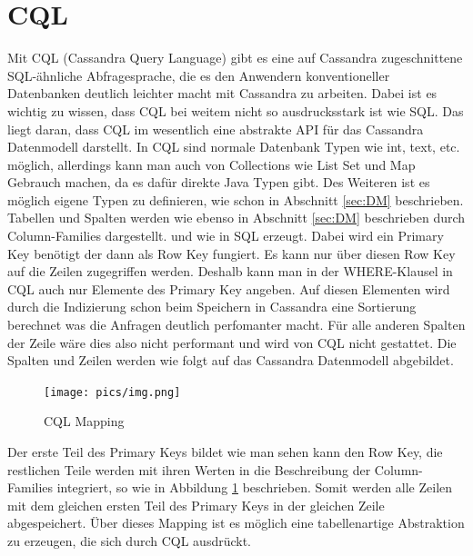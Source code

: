 \section{CQL}
Mit CQL (Cassandra Query Language) gibt es eine auf Cassandra zugeschnittene SQL-ähnliche Abfragesprache, die es den Anwendern konventioneller Datenbanken deutlich leichter macht mit Cassandra zu arbeiten. Dabei ist es wichtig zu wissen, dass CQL bei weitem nicht so ausdrucksstark ist wie SQL. Das liegt daran, dass CQL im wesentlich eine abstrakte API für das Cassandra Datenmodell darstellt. In CQL sind normale Datenbank Typen wie int, text, etc. möglich, allerdings kann man auch von Collections wie List Set und Map Gebrauch machen, da es dafür direkte Java Typen gibt. Des Weiteren ist es möglich eigene Typen zu definieren, wie schon in Abschnitt \ref{sec:DM} beschrieben.\\
Tabellen und Spalten werden wie ebenso in Abschnitt \ref{sec:DM} beschrieben durch Column-Families dargestellt. und wie in SQL erzeugt. Dabei wird ein Primary Key benötigt der dann als Row Key fungiert. Es kann nur über diesen Row Key auf die Zeilen zugegriffen werden. Deshalb kann man in der WHERE-Klausel in CQL auch nur Elemente des Primary Key angeben. Auf diesen Elementen wird durch die Indizierung schon beim Speichern in Cassandra eine Sortierung berechnet was die Anfragen deutlich perfomanter macht. Für alle anderen Spalten der Zeile wäre dies also nicht performant und wird von CQL nicht gestattet. Die Spalten und Zeilen werden wie folgt auf das Cassandra Datenmodell abgebildet.\\
\begin{figure}
	\centering
	\texttt{[image: pics/img.png]}
	\caption{CQL Mapping}
	\label{fig:mapping}
\end{figure}
Der erste Teil des Primary Keys bildet wie man sehen kann den Row Key, die restlichen Teile werden mit ihren Werten in die Beschreibung der Column-Families integriert, so wie in Abbildung \ref{fig:mapping} beschrieben. Somit werden alle Zeilen mit dem gleichen ersten Teil des Primary Keys in der gleichen Zeile abgespeichert. Über dieses Mapping ist es möglich eine tabellenartige Abstraktion zu erzeugen, die sich durch CQL ausdrückt.
